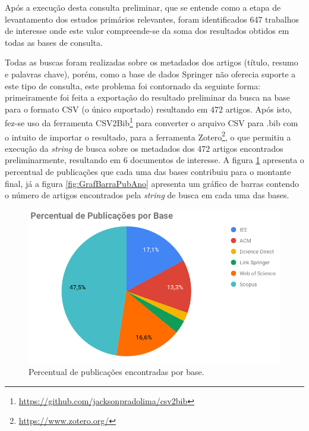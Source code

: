 \documentclass[ti,table]{texufpel} %
\begin{document}
  

Após a execução desta consulta preliminar, que se entende como a etapa de levantamento dos estudos primários relevantes, foram identificados 647 trabalhos de interesse onde este valor compreende-se da soma dos resultados obtidos em todas as bases de consulta. 

  

Todas as buscas foram realizadas sobre os metadados dos artigos (título, resumo e palavras chave), porém, como a base de dados Springer não oferecia suporte a este tipo de consulta, este problema foi contornado da seguinte forma: primeiramente foi feita a exportação do resultado preliminar da busca na base para o formato CSV (o único suportado) resultando em 472 artigos. Após isto, fez-se uso da ferramenta CSV2Bib\footnote{\url{https://github.com/jacksonpradolima/csv2bib}} para converter o arquivo CSV para .bib com o intuito de importar o resultado, para a ferramenta Zotero\footnote{\url{https://www.zotero.org/}}, o que permitiu a execução da \textit{string} de busca sobre os metadados dos 472 artigos encontrados preliminarmente, resultando em 6 documentos de interesse. A figura \ref{fig:GrafPizPubAno} apresenta o percentual de publicações que cada uma das bases contribuiu para o montante final, já a figura  \ref{fig:GrafBarraPubAno} apresenta um gráfico de barras contendo o número de artigos encontrados pela \textit{string} de busca em cada uma das bases.

  

  

\begin{figure}[ht] 

    \centering 

    \includegraphics[width=.9\textwidth]{imagens/GrafPizPubAno.png} 

    \caption{Percentual de publicações encontradas por base.} 

    \label{fig:GrafPizPubAno} 

\end{figure} 
\end{document}

